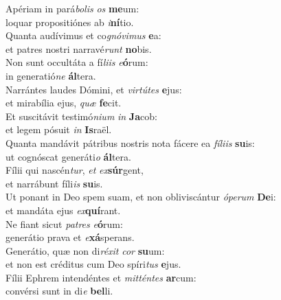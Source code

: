 \evenverse Apériam in pará\textit{bo}\textit{lis} \textit{os} \textbf{me}um:~\*\\
\evenverse loquar propositiónes ab \textit{i}\textbf{ní}tio.\\
\oddverse Quanta audívimus et co\textit{gnó}\textit{vi}\textit{mus} \textbf{e}a:~\*\\
\oddverse et patres nostri narravé\textit{runt} \textbf{no}bis.\\
\evenverse Non sunt occultáta a fí\textit{li}\textit{is} \textit{e}\textbf{ó}rum:~\*\\
\evenverse in generatió\textit{ne} \textbf{ál}tera.\\
\oddverse Narrántes laudes Dómini, et \textit{vir}\textit{tú}\textit{tes} \textbf{e}jus:~\*\\
\oddverse et mirabília ejus, \textit{quæ} \textbf{fe}cit.\\
\evenverse Et suscitávit testimó\textit{ni}\textit{um} \textit{in} \textbf{Ja}cob:~\*\\
\evenverse et legem pósuit \textit{in} \textbf{Is}raël.\\
\oddverse Quanta mandávit pátribus nostris nota fácere ea \textit{fí}\textit{li}\textit{is} \textbf{su}is:~\*\\
\oddverse ut cognóscat generáti\textit{o} \textbf{ál}tera.\\
\evenverse Fílii qui nascén\textit{tur}, \textit{et} \textit{ex}\textbf{súr}gent,~\*\\
\evenverse et narrábunt fíli\textit{is} \textbf{su}is.\\
\oddverse Ut ponant in Deo spem suam, et non obliviscántur \textit{ó}\textit{pe}\textit{rum} \textbf{De}i:~\*\\
\oddverse et mandáta ejus \textit{ex}\textbf{quí}rant.\\
\evenverse Ne fiant sicut \textit{pa}\textit{tres} \textit{e}\textbf{ó}rum:~\*\\
\evenverse generátio prava et \textit{e}\textbf{xá}sperans.\\
\oddverse Generátio, quæ non di\textit{ré}\textit{xit} \textit{cor} \textbf{su}um:~\*\\
\oddverse et non est créditus cum Deo spíri\textit{tus} \textbf{e}jus.\\
\evenverse Fílii Ephrem intendéntes et \textit{mit}\textit{tén}\textit{tes} \textbf{ar}cum:~\*\\
\evenverse convérsi sunt in di\textit{e} \textbf{bel}li.\\

